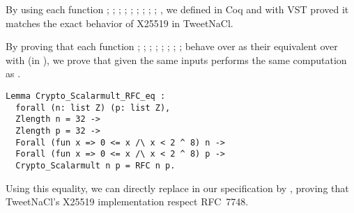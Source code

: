 
\begin{sloppypar}
      By using each function ; ; ; ;
      ; ; ; ; ;
      , we defined in Coq  and with VST
      proved it matches the exact behavior of X25519 in TweetNaCl.
\end{sloppypar}

\begin{sloppypar}
      By proving that each function ; ; ;
      ; ; ; ;
      ;  behave over  as their equivalent
      over  with  (in \Zfield), we prove that given the same inputs
       performs the same computation as .
\end{sloppypar}

\begin{lstlisting}[language=Coq]
Lemma Crypto_Scalarmult_RFC_eq :
  forall (n: list Z) (p: list Z),
  Zlength n = 32 ->
  Zlength p = 32 ->
  Forall (fun x => 0 <= x /\ x < 2 ^ 8) n ->
  Forall (fun x => 0 <= x /\ x < 2 ^ 8) p ->
  Crypto_Scalarmult n p = RFC n p.
\end{lstlisting}

Using this equality, we can directly replace  in our
specification by , proving that TweetNaCl's X25519 implementation
respect RFC~7748.




